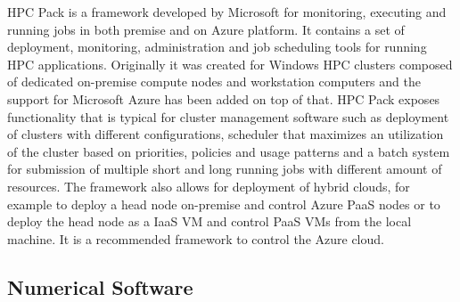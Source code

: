 \documentclass[3p,times]{elsarticle}
\begin{document}
HPC Pack is a framework developed by Microsoft for monitoring, executing and running jobs in both premise and on Azure platform. It contains a set of deployment, monitoring, administration and job scheduling tools for running HPC applications. Originally it was created for Windows HPC clusters composed of dedicated on-premise compute nodes and workstation computers and the support for Microsoft Azure has been added on top of that. HPC Pack exposes functionality that is typical for cluster management software such as deployment of clusters with different configurations, scheduler that maximizes an utilization of the cluster based on priorities, policies and usage patterns and a batch system for submission of multiple short and long running jobs with different amount of resources. The framework also allows for deployment of hybrid clouds, for example to deploy a head node on-premise and control Azure PaaS nodes or to deploy the head node as a IaaS VM and control PaaS VMs from the local machine. It is a recommended framework to control the Azure cloud.

\subsection{Numerical Software}
\label{sec:numerical}
\end{document}
